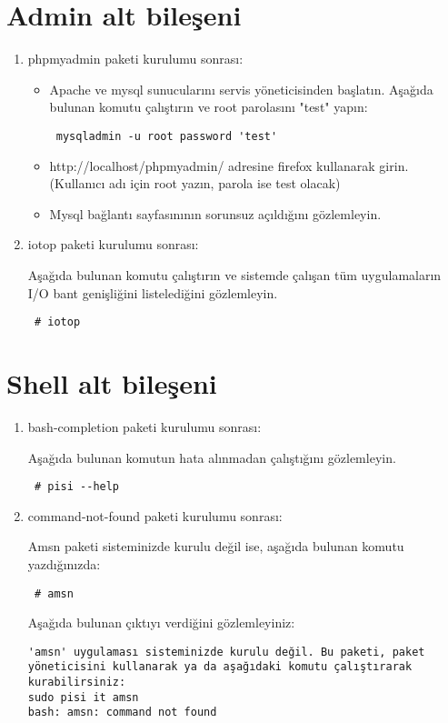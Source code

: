\documentclass[a4paper,10pt]{article}
\begin{document}
\section{Admin alt bileşeni}
\begin{enumerate}
 \item phpmyadmin paketi kurulumu sonrası:
\begin{itemize}
 \item Apache ve mysql sunucularını servis yöneticisinden başlatın. Aşağıda bulunan komutu çalıştırın ve root parolasını "test" yapın:
\begin{verbatim}
 mysqladmin -u root password 'test'
\end{verbatim}

 \item http://localhost/phpmyadmin/ adresine firefox kullanarak girin. (Kullanıcı adı için root yazın, parola ise test olacak)
 \item Mysql bağlantı sayfasınının sorunsuz açıldığını gözlemleyin.
\end{itemize}



 \item iotop paketi kurulumu sonrası:

Aşağıda bulunan komutu çalıştırın ve sistemde çalışan tüm uygulamaların I/O bant genişliğini listelediğini gözlemleyin.
\begin{verbatim}
 # iotop
\end{verbatim}

\end{enumerate}
\section{Shell alt bileşeni}
\begin{enumerate}
 \item bash-completion paketi kurulumu sonrası:

Aşağıda bulunan komutun hata alınmadan çalıştığını gözlemleyin.
\begin{verbatim}
 # pisi --help
\end{verbatim}

\item command-not-found paketi kurulumu sonrası:

Amsn paketi sisteminizde kurulu değil ise, aşağıda bulunan komutu yazdığınızda:
\begin{verbatim}
 # amsn
\end{verbatim}

Aşağıda bulunan çıktıyı verdiğini gözlemleyiniz:
\begin{verbatim}
'amsn' uygulaması sisteminizde kurulu değil. Bu paketi, paket yöneticisini kullanarak ya da aşağıdaki komutu çalıştırarak kurabilirsiniz:
sudo pisi it amsn
bash: amsn: command not found
\end{verbatim}

\end{enumerate}
\end{document}
